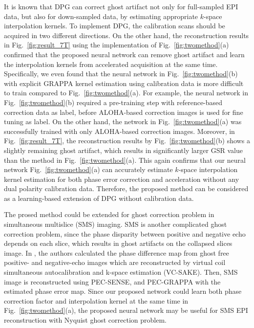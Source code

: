 \documentclass[num-refs]{wiley-article}
\newcommand{\0}{{\boldsymbol{0}}}
\newcommand{\1}{\blmath{1}}
\begin{document}
	It is known that DPG  \cite{Hoge2016dual} can correct ghost artifact not only for full-sampled EPI data, but also for down-sampled data, by estimating appropriate $k$-space interpolation kernels. To implement DPG, the calibration scans should be acquired in two different directions. On the other hand, the reconstruction results in Fig.~\ref{fig:result_7T}  using the implementation of Fig.~\ref{fig:twomethod}(a) confirmed that the proposed neural network can remove ghost artifact and learn the interpolation kernels from accelerated acquisition at the same time.
	Specifically, we even found that the neural network in Fig.~\ref{fig:twomethod}(b) with explicit GRAPPA kernel estimation using calibration data is more difficult to train compared to Fig.~\ref{fig:twomethod}(a).  For example, the neural network in  Fig.~\ref{fig:twomethod}(b) required a pre-training step  with reference-based correction data as label, before  ALOHA-based correction images is used for fine tuning as label. On the other hand, the network in Fig.~\ref{fig:twomethod}(a) was successfully trained with only ALOHA-based correction images. Moreover, in  Fig.~\ref{fig:result_7T}, the reconstruction results by Fig.~\ref{fig:twomethod}(b) shows a slightly remaining ghost artifact, which results in significantly larger GSR value than the method in Fig.~\ref{fig:twomethod}(a).
	This again confirms that our neural network Fig.~\ref{fig:twomethod}(a)  can accurately estimate  $k$-space interpolation kernel estimation for both phase error correction and acceleration without any dual polarity calibration data. Therefore, the proposed method can be considered as a learning-based extension of DPG without calibration data.
	
	The prosed method could be extended for  ghost correction problem in simultaneous multislice (SMS) imaging.
	SMS is another complicated ghost correction problem, since the phase disparity between positive and negative echo depends on each slice, which
	results in ghost artifacts on the collapsed slices image. In \cite{lyu2018robust,liu2019pecgrappa}, the authors calculated the phase difference map from ghost free positive- and negative-echo images which are reconstructed by virtual coil simultaneous autocalibration and k-space estimation (VC-SAKE). Then,  SMS image is reconstructed using PEC-SENSE\cite{lyu2018robust}, and PEC-GRAPPA\cite{liu2019pecgrappa} with the estimated phase error map.
	Since our proposed network could learn both phase correction factor and interpolation kernel at the same time in Fig.~\ref{fig:twomethod}(a),  the proposed neural network may
	be useful   for SMS EPI reconstruction with Nyquist ghost correction problem.
	
\end{document}
